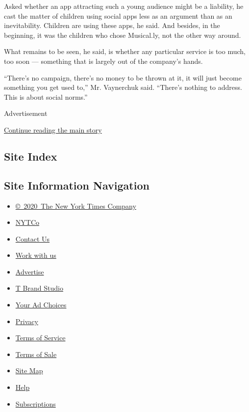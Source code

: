 Asked whether an app attracting such a young audience might be a
liability, he cast the matter of children using social apps less as an
argument than as an inevitability. Children are using these apps, he
said. And besides, in the beginning, it was the children who chose
Musical.ly, not the other way around.

What remains to be seen, he said, is whether any particular service is
too much, too soon --- something that is largely out of the company's
hands.

``There's no campaign, there's no money to be thrown at it, it will just
become something you get used to,'' Mr. Vaynerchuk said. ``There's
nothing to address. This is about social norms.''

Advertisement

\protect\hyperlink{after-bottom}{Continue reading the main story}

\hypertarget{site-index}{%
\subsection{Site Index}\label{site-index}}

\hypertarget{site-information-navigation}{%
\subsection{Site Information
Navigation}\label{site-information-navigation}}

\begin{itemize}
\tightlist
\item
  \href{https://help.nytimes.com/hc/en-us/articles/115014792127-Copyright-notice}{©~2020~The
  New York Times Company}
\end{itemize}

\begin{itemize}
\tightlist
\item
  \href{https://www.nytco.com/}{NYTCo}
\item
  \href{https://help.nytimes.com/hc/en-us/articles/115015385887-Contact-Us}{Contact
  Us}
\item
  \href{https://www.nytco.com/careers/}{Work with us}
\item
  \href{https://nytmediakit.com/}{Advertise}
\item
  \href{http://www.tbrandstudio.com/}{T Brand Studio}
\item
  \href{https://www.nytimes.com/privacy/cookie-policy\#how-do-i-manage-trackers}{Your
  Ad Choices}
\item
  \href{https://www.nytimes.com/privacy}{Privacy}
\item
  \href{https://help.nytimes.com/hc/en-us/articles/115014893428-Terms-of-service}{Terms
  of Service}
\item
  \href{https://help.nytimes.com/hc/en-us/articles/115014893968-Terms-of-sale}{Terms
  of Sale}
\item
  \href{https://spiderbites.nytimes.com}{Site Map}
\item
  \href{https://help.nytimes.com/hc/en-us}{Help}
\item
  \href{https://www.nytimes.com/subscription?campaignId=37WXW}{Subscriptions}
\end{itemize}
